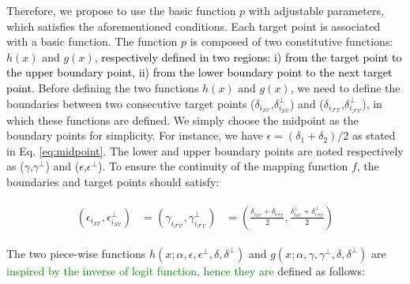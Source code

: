 Therefore, we propose to use the basic function $p$ with adjustable parameters, which satisfies the aforementioned conditions. %
Each target point is associated with a basic function. 
The function $p$ is composed of two constitutive functions: $h(x)$ and $g(x)$, \textcolor{black}{respectively defined in two regions: i) from the target point to the upper boundary point, ii) from the lower boundary point to the next target point. }%
Before defining the two functions $h(x)$ and $g(x)$, we need to define the boundaries between two consecutive target points  ($\delta_{i_{{\mathcal{SV}}}}$,$\delta^{\perp}_{i_{{\mathcal{SV}}}}$) and ($\delta_{i_{{\mathcal{FV}}}}$,$\delta^{\perp}_{i_{{\mathcal{FV}}}}$), in which these functions are defined.%
We simply choose the midpoint as the boundary points for simplicity. For instance, we have $\epsilon=(\delta_1+\delta_2)/2$ %
as stated in Eq. \ref{eq:midpoint}.
The lower and upper boundary points are noted respectively as ($\gamma$,$\gamma^{\perp}$) and ($\epsilon$,$\epsilon^{\perp}$). To ensure the continuity of the mapping function $f$, the boundaries and target points should satisfy:
 

\begin{align}
\label{eq:midpoint}
\begin{aligned}
(\epsilon_{i_{{\mathcal{SV}}}},\epsilon^{\perp}_{i_{{\mathcal{SV}}}}) &=
(\gamma_{i_{{\mathcal{FV}}}},\gamma^{\perp}_{i_{{\mathcal{FV}}}}) &=
(\frac{\delta_{i_{{\mathcal{SV}}}} + \delta_{i_{{\mathcal{FV}}}}}{2}, \frac{\delta^{\perp}_{i_{{\mathcal{SV}}}} + \delta^{\perp}_{i_{{\mathcal{FV}}}}}{2})
\end{aligned}
\end{align}

The two piece-wise functions $h(x;\alpha,\epsilon,\epsilon^{\perp},\delta,\delta^{\perp})$ and $g(x;\alpha,\gamma,\gamma^{\perp},\delta,\delta^{\perp})$ are \textcolor{green}{inspired by the inverse of logit function, hence they are} defined as follows:%

